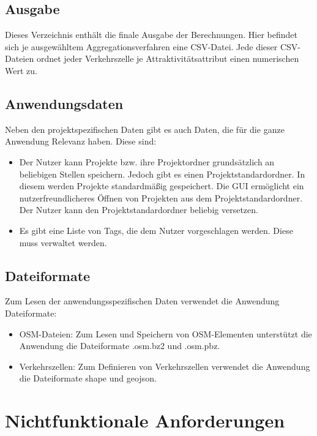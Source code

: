 \documentclass[parskip=full]{scrartcl} %
\begin{document}
\subsection*{Ausgabe} \hypertarget{finalresult}{}
Dieses Verzeichnis enthält die finale Ausgabe der Berechnungen. Hier befindet sich je ausgewähltem Aggregationsverfahren eine CSV-Datei. Jede dieser CSV-Dateien ordnet jeder Verkehrszelle je Attraktivitätsattribut einen numerischen Wert zu.


\subsection*{Anwendungsdaten}
Neben den projektspezifischen Daten gibt es auch Daten, die für die ganze Anwendung Relevanz haben. Diese sind:
\begin{itemize}
    \item Der Nutzer kann Projekte bzw. ihre Projektordner grundsätzlich an beliebigen Stellen speichern. Jedoch gibt es einen Projektstandardordner. In diesem werden Projekte standardmäßig gespeichert. Die GUI ermöglicht ein nutzerfreundlicheres Öffnen von Projekten aus dem Projektstandardordner. Der Nutzer kann den Projektstandardordner beliebig versetzen.
    \item Es gibt eine Liste von Tags, die dem Nutzer vorgeschlagen werden. Diese muss verwaltet werden.
\end{itemize}


\subsection*{Dateiformate} \hypertarget{dataformat}{}
Zum Lesen der anwendungsspezifischen Daten verwendet die Anwendung Dateiformate:
\begin{itemize}
    \item OSM-Dateien: Zum Lesen und Speichern von OSM-Elementen unterstützt die Anwendung die Dateiformate .osm.bz2 und .osm.pbz.
    \item Verkehrszellen: Zum Definieren von Verkehrszellen verwendet die Anwendung die Dateiformate shape und geojson.
\end{itemize}


\newpage







\section{Nichtfunktionale Anforderungen}
\end{document}
